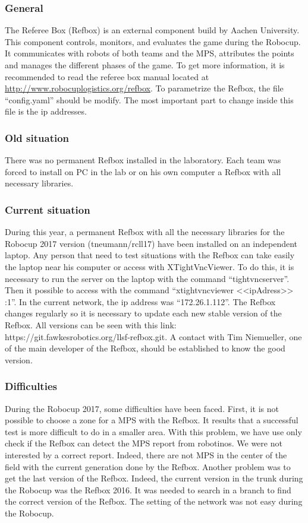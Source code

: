 
\subsubsection{General}

The Referee Box (Refbox) is an external component build by Aachen University. This component controls, monitors, and evaluates the game during the Robocup. It communicates with robots of both teams and the MPS, attributes the points and manages the different phases of the game. To get more information, it is recommended to read the referee box manual located at \url{http://www.robocuplogistics.org/refbox}. To parametrize the Refbox, the file “config.yaml” should be modify. The most important part to change inside this file is the ip addresses.
 

\subsubsection{Old situation}

There was no permanent Refbox installed in the laboratory. Each team was forced to install on PC in the lab or on his own computer a Refbox with all necessary libraries.


\subsubsection{Current situation}

During this year, a permanent Refbox with all the necessary libraries for the Robocup 2017 version (tneumann/rcll17) have been installed on an independent laptop. Any person that need to test situations with the Refbox can take easily the laptop near his computer or access with XTightVncViewer.  To do this, it is necessary to run the server on the laptop with the command “tightvncserver”. Then it possible to access with the command “xtightvncviewer <<ipAdress>> :1”.  In the current network, the ip address was “172.26.1.112”. The Refbox changes regularly so it is necessary to update each new stable version of the Refbox. All versions can be seen with this link: https://git.fawkesrobotics.org/llsf-refbox.git. A contact with Tim Niemueller, one of the main developer of the Refbox, should be established to know the good version.


\subsubsection{Difficulties}

During the Robocup 2017, some difficulties have been faced. First, it is not possible to choose a zone for a MPS with the Refbox. It results that a successful test is more difficult to do in a smaller area. With this problem, we have use only check if the Refbox can detect the MPS report from robotinos. We were not interested by a correct report. Indeed, there are not MPS in the center of the field with the current generation done by the Refbox. Another problem was to get the last version of the Refbox. Indeed, the current version in the trunk during the Robocup was the Refbox 2016. It was needed to search in a branch to find the correct version of the Refbox. The setting of the network was not easy during the Robocup.

